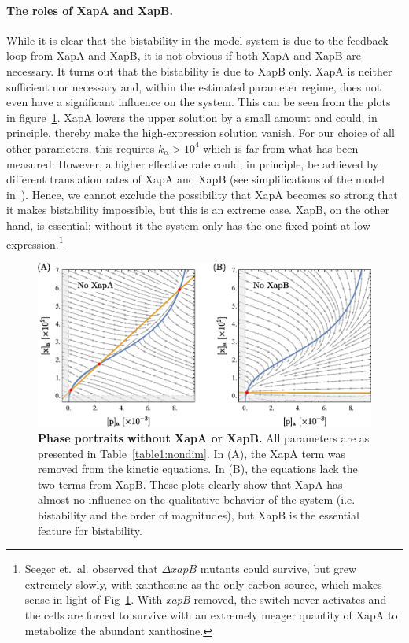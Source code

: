 \documentclass[10pt,letterpaper]{article}
\newcommand{\n}[1]{\mathrm{#1}}
\begin{document}
\paragraph*{The roles of XapA and XapB.}
While it is clear that the bistability in the model system is due to the
feedback loop from XapA and XapB, it is not obvious if both XapA and XapB
are necessary. It turns out that the bistability is due to XapB only. XapA
is neither sufficient nor necessary and, within the estimated parameter
regime, does not even have a significant influence on the system. This can
be seen from the plots in figure~\ref{fig6:xapAB}. XapA lowers the upper
solution by a small amount and could, in principle, thereby make the
high-expression solution vanish. For our choice of all other parameters,
this requires $k_{\n{\alpha}} > 10^4$ which is far from what has been
measured. However, a higher effective rate could, in principle, be achieved by
different translation rates of XapA and XapB (see simplifications of the
model in~). Hence, we cannot exclude the possibility that
XapA becomes so strong that it makes bistability impossible, but this is an
extreme case. XapB, on the other hand, is essential; without it the system
only has the one fixed point at low expression.\footnote{
Seeger et.\ al.\cite{Seeger1995} observed that $\Delta xapB$ mutants could
survive, but grew extremely slowly, with xanthosine as the only carbon
source, which makes sense in light of Fig~\ref{fig6:xapAB}.
With \textit{xapB} removed, the switch never activates and the cells are
forced to survive with an extremely meager quantity of XapA to metabolize
the abundant xanthosine.}

\begin{figure}%
	\includegraphics[width=1\textwidth]{media/XapAB.eps}
	\centering
	\caption{{\bf Phase portraits without XapA or XapB.}
		All parameters are as presented in Table~\ref{table1:nondim}. In
		(A), the XapA term was removed from the kinetic equations. In (B),
		the equations lack the two terms from XapB. These plots clearly show
		that XapA has almost no influence on the qualitative behavior of the
		system (i.e. bistability and the order of magnitudes), but XapB is
		the essential feature for bistability.}
	\label{fig6:xapAB}
\end{figure}
\end{document}
